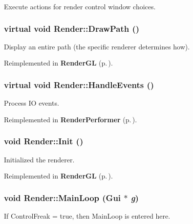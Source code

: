 Execute actions for render control window choices.

\subsubsection{\setlength{\rightskip}{0pt plus 5cm}virtual void Render::Draw\-Path ()\hspace{0.3cm}{\tt  [inline, virtual]}}\label{classRender_a12}


Display an entire path (the specific renderer determines how).



Reimplemented in {\bf Render\-GL} {\rm (p.\,\pageref{classRenderGL_b11})}.
\subsubsection{\setlength{\rightskip}{0pt plus 5cm}virtual void Render::Handle\-Events ()\hspace{0.3cm}{\tt  [inline, virtual]}}\label{classRender_a5}


Process IO events.



Reimplemented in {\bf Render\-Performer} {\rm (p.\,\pageref{classRenderPerformer_a5})}.
\subsubsection{\setlength{\rightskip}{0pt plus 5cm}void Render::Init ()\hspace{0.3cm}{\tt  [virtual]}}\label{classRender_a4}


Initialized the renderer.



Reimplemented in {\bf Render\-GL} {\rm (p.\,\pageref{classRenderGL_a5})}.
\subsubsection{\setlength{\rightskip}{0pt plus 5cm}void Render::Main\-Loop ({\bf Gui} $\ast$ {\em g})\hspace{0.3cm}{\tt  [virtual]}}\label{classRender_a6}


If Control\-Freak = true, then Main\-Loop is entered here.



